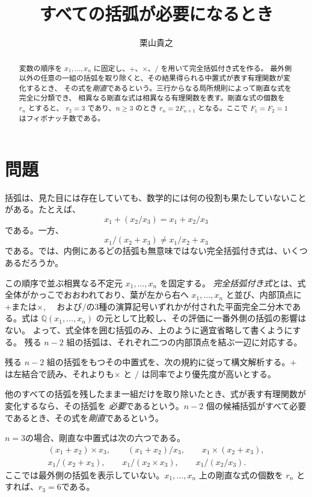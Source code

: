 \documentclass[11pt]{ltjsarticle}
\title{すべての括弧が必要になるとき}
\author{栗山貴之}
\date{}
\newcommand{\Q}{\mathbb{Q}}
\begin{document}
\maketitle

\begin{abstract}
変数の順序を $x_1,\ldots,x_n$ に固定し、$+$、$\times$、$/$ を用いて完全括弧付き式を作る。
最外側以外の任意の一組の括弧を取り除くと、その結果得られる中置式が表す有理関数が変化するとき、
その式を\emph{剛直}であるという。三行からなる局所規則によって剛直な式を完全に分類でき、
相異なる剛直な式は相異なる有理関数を表す。剛直な式の個数を $r_n$ とすると、
$r_2=3$ であり、$n\ge3$ のとき $r_n=2F_{n+1}$ となる。ここで $F_1=F_2=1$ はフィボナッチ数である。
\end{abstract}

\section{問題}

括弧は、見た目には存在していても、数学的には何の役割も果たしていないことがある。たとえば、
\[
 x_1+(x_2/x_3)=x_1+x_2/x_3
\]
である。一方、
\[
 x_1/(x_2+x_3)\ne x_1/x_2+x_3
\]
である。では、内側にあるどの括弧も無意味ではない完全括弧付き式は、いくつあるだろうか。

この順序で並ぶ相異なる不定元 $x_1,\ldots,x_n$ を固定する。
\emph{完全括弧付き式}とは、式全体がかっこでおおわれており、葉が左から右へ $x_1,\ldots,x_n$ と並び、内部頂点に$+$または$\times$, 　および$/$の3種の演算記号いずれかが付された平面完全二分木である。式は $\Q(x_1,\ldots,x_n)$ の元として比較し、その評価に一番外側の括弧の影響はない。
よって、式全体を囲む括弧のみ、上のように適宜省略して書くようにする。
残る $n-2$ 組の括弧は、それぞれ二つの内部頂点を結ぶ一辺に対応する。

残る $n-2$ 組の括弧をもつその中置式を、次の規約に従って構文解析する。$+$ は左結合で読み、それよりも$\times$ と $/$ は同率でより優先度が高いとする。

他のすべての括弧を残したまま一組だけを取り除いたとき、式が表す有理関数が変化するなら、その括弧を
\emph{必要}であるという。$n-2$ 個の候補括弧がすべて必要であるとき、その式を\emph{剛直}であるという。

$n=3$の場合、剛直な中置式は次の六つである。
\[
\begin{gathered}
 (x_1+x_2)\times x_3,\qquad
 (x_1+x_2)/x_3,\qquad
 x_1\times(x_2+x_3),\\
 x_1/(x_2+x_3),\qquad
 x_1/(x_2\times x_3),\qquad
 x_1/(x_2/x_3).
\end{gathered}
\]
ここでは最外側の括弧を表示していない。$x_1,\ldots,x_n$ 上の剛直な式の個数を $r_n$ とすれば、$r_3=6$である。
\end{document}
